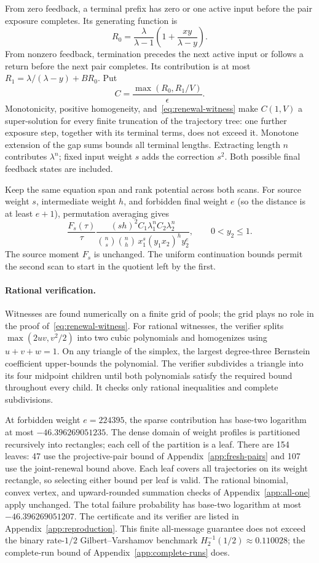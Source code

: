From zero feedback, a terminal prefix has zero or one active input before
the pair exposure completes. Its generating function is
\[
 R_0=\frac\lambda{\lambda-1}
       \left(1+\frac{xy}{\lambda-y}\right).
\]
From nonzero feedback, termination precedes the next active input or
follows a return before the next pair completes. Its contribution is at
most $R_1=\lambda/(\lambda-y)+BR_0$. Put
\[
 C=\frac{\max(R_0,R_1/V)}\epsilon.
\]
Monotonicity, positive homogeneity, and~\eqref{eq:renewal-witness} make
$C(1,V)$ a super-solution for every finite truncation of the trajectory
tree: one further exposure step, together with its terminal terms,
does not exceed it. Monotone extension of the gap sums bounds all
terminal lengths. Extracting length $n$ contributes $\lambda^n$; fixed
input weight $s$ adds the correction $s^2$. Both possible final feedback
states are included.

Keep the same equation span and rank potential across both scans.
For source weight $s$, intermediate weight $h$, and forbidden final
weight $e$ (so the distance is at least $e+1$), permutation averaging gives
\[
 \frac{F_s(\tau)}\tau
 \frac{(sh)^2 C_1\lambda_1^n C_2\lambda_2^n}
 {\binom ns\binom nh\,x_1^s(y_1x_2)^h y_2^e},
 \qquad 0<y_2\le1.
\]
The source moment $F_s$ is unchanged. The uniform continuation bounds
permit the second scan to start in the quotient left by the first.

\paragraph{Rational verification.}
Witnesses are found numerically on a finite grid of pools; the grid
plays no role in the proof of~\eqref{eq:renewal-witness}. For rational
witnesses, the verifier splits $\max(2uv,v^2/2)$ into two cubic polynomials
and homogenizes using $u+v+w=1$. On any triangle of the simplex, the
largest degree-three Bernstein coefficient upper-bounds the polynomial.
The verifier subdivides a triangle into its four midpoint children until
both polynomials satisfy the required bound throughout every child.
It checks only rational inequalities and complete subdivisions.

At forbidden weight $e=224395$, the sparse contribution has base-two
logarithm at most $-46.396269051235$. The dense domain of weight
profiles is partitioned recursively into rectangles; each cell of the
partition is a leaf. There are 154 leaves: 47 use the projective-pair
bound of Appendix~\ref{app:fresh-pairs} and 107 use the joint-renewal
bound above. Each leaf covers all trajectories on its weight rectangle,
so selecting either bound per leaf is valid. The rational binomial,
convex vertex, and upward-rounded summation checks of
Appendix~\ref{app:all-one} apply unchanged. The total failure probability
has base-two logarithm at most $-46.396269051207$. The certificate and
its verifier are listed in Appendix~\ref{app:reproduction}. This finite
all-message guarantee does not exceed the binary rate-$1/2$
Gilbert--Varshamov benchmark $H_2^{-1}(1/2)\approx0.110028$; the
complete-run bound of Appendix~\ref{app:complete-runs} does.
